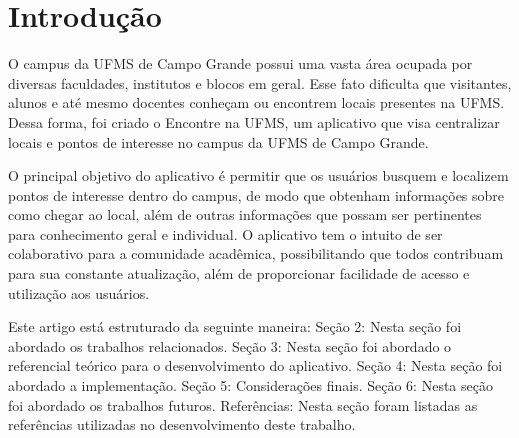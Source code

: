 \section{Introdução}
O campus da UFMS de Campo Grande possui uma vasta área ocupada por diversas faculdades, institutos e blocos em geral. Esse fato dificulta que visitantes, alunos e até mesmo docentes conheçam ou encontrem locais presentes na UFMS. Dessa forma, foi criado o Encontre na UFMS, um aplicativo que visa centralizar locais e pontos de interesse no campus da UFMS de Campo Grande.

O principal objetivo do aplicativo é permitir que os usuários busquem e localizem pontos de interesse dentro do campus, de modo que obtenham informações sobre como chegar ao local, além de outras informações que possam ser pertinentes para conhecimento geral e individual. O aplicativo tem o intuito de ser colaborativo para a comunidade acadêmica, possibilitando que todos contribuam para sua constante atualização, além de proporcionar facilidade de acesso e utilização aos usuários.

Este artigo está estruturado da seguinte maneira: Seção 2: Nesta seção foi abordado os trabalhos relacionados. Seção 3: Nesta seção foi abordado o referencial teórico para o desenvolvimento do aplicativo. Seção 4: Nesta seção foi abordado a implementação. Seção 5: Considerações finais. Seção 6: Nesta seção foi abordado os trabalhos futuros. Referências: Nesta seção foram listadas as referências utilizadas no desenvolvimento deste trabalho.